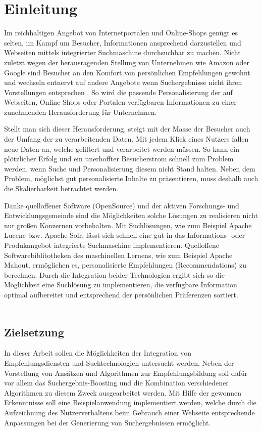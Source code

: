 \section{Einleitung}

Im reichhaltigen Angebot von Internetportalen und Online-Shops genügt es selten, im Kampf um Besucher, Informationen ansprechend darzustellen und Webseiten mittels integrierter Suchmaschine durchsuchbar zu machen. Nicht zuletzt wegen der herausragenden Stellung von Unternehmen wie Amazon oder Google sind Besucher an den Komfort von persönlichen Empfehlungen gewohnt und wechseln entnervt auf andere Angebote wenn Suchergebnisse nicht ihren Vorstellungen entsprechen \citep[Kap. 10]{hb,rs}. So wird die passende Personalisierung der auf Webseiten, Online-Shops oder Portalen verfügbaren Informationen zu einer zunehmenden Herausforderung für Unternehmen.

Stellt man sich dieser Herausforderung, steigt mit der Masse der Besucher auch der Umfang der zu verarbeitenden Daten. Mit jedem Klick eines Nutzers fallen neue Daten an, welche gefiltert und verarbeitet werden müssen. So kann ein plötzlicher Erfolg und ein unerhoffter Besucherstrom schnell zum Problem werden, wenn Suche und Personalisierung diesem nicht Stand halten. Neben dem Problem, möglichst gut personalisierte Inhalte zu präsentieren, muss deshalb auch die Skalierbarkeit betrachtet werden.

Danke quelloffener Software (OpenSource) und der aktiven Forschungs- und Entwicklungsgemeinde sind die Möglichkeiten solche Lösungen zu realisieren nicht nur großen Konzernen vorbehalten. Mit Suchlösungen, wie zum Beispiel Apache Lucene bzw. Apache Solr, lässt sich schnell eine gut in das Informations- oder Produkangebot integrierte Suchmaschine implementieren. Quelloffene Softwarebiblitotheken des maschinellen Lernens, wie zum Beispiel Apache Mahout, ermöglichen es, personalisierte Empfehlungen (Recommendations) zu berechnen. Durch die Integration beider Technologien ergibt sich so die Möglichkeit eine Suchlösung zu implementieren, die verfügbare Information optimal aufbereitet und entsprechend der persönlichen Präferenzen sortiert. \\ \\

\subsection{Zielsetzung}

In dieser Arbeit sollen die Möglichkeiten der Integration von Empfehlungsdiensten und Suchtechnologien untersucht werden. Neben der Vorstellung von Ansätzen und Algorithmen zur Empfehlungsbildung soll dafür vor allem das Suchergebnis-Boosting und die Kombination verschiedener Algorithmen zu diesem Zweck ausgearbeitet werden. Mit Hilfe der gewonnen Erkenntnisse soll eine Beispielanwendung implementiert werden, welche durch die Aufzeichnung des Nutzerverhaltens beim Gebrauch einer Webseite entsprechende Anpassungen bei der Generierung von Suchergebnissen ermöglicht.

